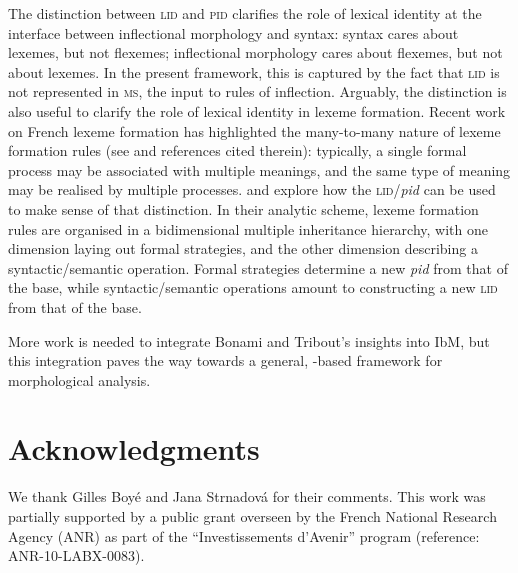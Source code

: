\documentclass[output=paper]{langsci/langscibook}
\begin{document}
The distinction between \textsc{lid} and \textsc{pid} clarifies the role
of lexical identity at the interface between inflectional morphology
and syntax: syntax cares about lexemes, but not flexemes; inflectional
morphology cares about flexemes, but not about lexemes. In the present framework, this is captured by the fact that \textsc{lid} is not
represented in \textsc{ms}, the input to rules of
inflection. Arguably, the distinction is also useful to clarify the
role of lexical identity in lexeme formation. Recent work on French
lexeme formation has highlighted the many-to-many nature of lexeme
formation rules (see \citealt[§3.1]{Bonami15b} and references
cited therein): typically, a single formal process may be associated
with multiple meanings, and the same type of meaning may be realised
by multiple processes. \citet{Bonami12t} and \citet{Tribout14} explore how the
\textsc{lid}/\emph{pid} can be used to make sense of that distinction.
In their analytic scheme, lexeme formation rules are organised in a
bidimensional multiple inheritance hierarchy, with one dimension
laying out formal strategies, and the other dimension describing a
syntactic/semantic operation.  Formal strategies determine a new
\emph{pid} from that of the base, while syntactic/semantic operations
amount to constructing a new \textsc{lid} from that of the base.

  
More work is needed to integrate Bonami and Tribout's insights into IbM,
but this integration paves the way towards a general, -based
framework for morphological analysis.

    


\section*{Acknowledgments}

We thank  Gilles Boyé and Jana Strnadová for their comments. This  work was partially supported  by a public grant
    overseen by the French National Research Agency (ANR) as part of
    the ``Investissements d'Avenir'' program (reference:
    ANR-10-LABX-0083).


{\sloppy
    \printbibliography[heading=subbibliography,notkeyword=this]
}
\end{document}
